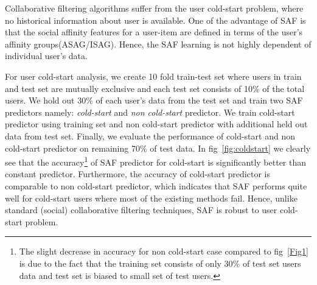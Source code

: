 Collaborative filtering algorithms suffer from the user cold-start
problem, where no historical information about user is available. One
of the advantage of SAF is that the social affinity features for a
user-item are defined in terms of the user's affinity
groups(ASAG/ISAG).  Hence, the SAF learning is not highly dependent of
individual user's data.

For user cold-start analysis, we create 10 fold train-test set where
users in train and test set are mutually exclusive and each test set
consists of 10\% of the total users. We hold out 30\% of each user's
data from the test set and train two SAF predictors
namely: \textit{cold-start} and \textit{non cold-start} predictor.  We
train cold-start predictor using training set and non cold-start
predictor with additional held out data from test set. Finally, we
evaluate the performance of cold-start and non cold-start predictor on
remaining 70\% of test data. In fig~\ref{fig:coldstart} we clearly see
that the accuracy\footnote{ The slight decrease in accuracy for non
cold-start case compared to fig~\ref{Fig1} is due to the fact that the
training set consists of only 30\% of test set users data and test set
is biased to small set of test users.}  of SAF predictor for
cold-start is significantly better than constant
predictor. Furthermore, the accuracy of cold-start predictor is
comparable to non cold-start predictor, which indicates that SAF
performs quite well for cold-start users where most of the existing
methods fail.  Hence, unlike standard (social) collaborative filtering
techniques, SAF is robust to user cold-start problem.


